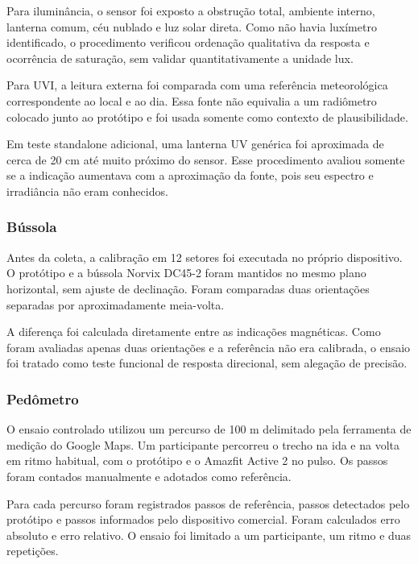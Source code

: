 \documentclass[a4paper,12pt]{article}
\begin{document}
Para ilumin\^ancia, o sensor foi exposto a obstru\c{c}\~ao total, ambiente interno, lanterna comum, c\'eu nublado e luz solar direta. Como n\~ao havia lux\'imetro identificado, o procedimento verificou ordena\c{c}\~ao qualitativa da resposta e ocorr\^encia de satura\c{c}\~ao, sem validar quantitativamente a unidade lux.


Para UVI, a leitura externa foi comparada com uma refer\^encia meteorol\'ogica correspondente ao local e ao dia. Essa fonte n\~ao equivalia a um radi\^ometro colocado junto ao prot\'otipo e foi usada somente como contexto de plausibilidade.

Em teste standalone adicional, uma lanterna UV gen\'erica foi aproximada de cerca de 20 cm at\'e muito pr\'oximo do sensor. Esse procedimento avaliou somente se a indica\c{c}\~ao aumentava com a aproxima\c{c}\~ao da fonte, pois seu espectro e irradi\^ancia n\~ao eram conhecidos.


\subsubsection{B\'ussola}

Antes da coleta, a calibra\c{c}\~ao em 12 setores foi executada no pr\'oprio dispositivo. O prot\'otipo e a b\'ussola Norvix DC45-2 foram mantidos no mesmo plano horizontal, sem ajuste de declina\c{c}\~ao. Foram comparadas duas orienta\c{c}\~oes separadas por aproximadamente meia-volta.


A diferen\c{c}a foi calculada diretamente entre as indica\c{c}\~oes magn\'eticas. Como foram avaliadas apenas duas orienta\c{c}\~oes e a refer\^encia n\~ao era calibrada, o ensaio foi tratado como teste funcional de resposta direcional, sem alega\c{c}\~ao de precis\~ao.


\subsubsection{Ped\^ometro}

O ensaio controlado utilizou um percurso de 100 m delimitado pela ferramenta de medi\c{c}\~ao do Google Maps. Um participante percorreu o trecho na ida e na volta em ritmo habitual, com o prot\'otipo e o Amazfit Active 2 no pulso. Os passos foram contados manualmente e adotados como refer\^encia.


Para cada percurso foram registrados passos de refer\^encia, passos detectados pelo prot\'otipo e passos informados pelo dispositivo comercial. Foram calculados erro absoluto e erro relativo. O ensaio foi limitado a um participante, um ritmo e duas repeti\c{c}\~oes.
\end{document}
